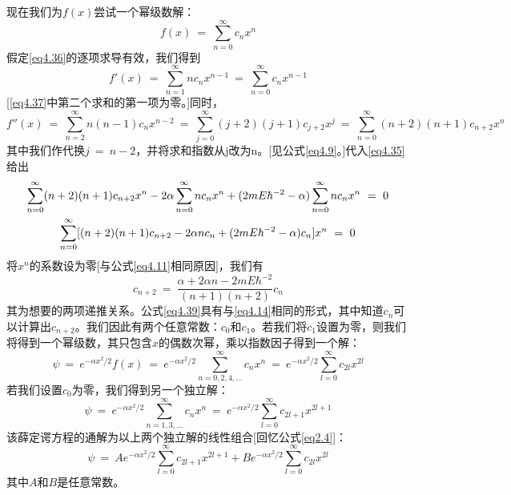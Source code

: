 \documentclass[12pt,a4paper,openany]{ctexbook}
\begin{document}
\begin{flushleft}
现在我们为$f(x)$尝试一个幂级数解：
\begin{equation}
    f(x)\ =\ \sum_{n=0}^\infty c_nx^n \label{eq4.36}
\end{equation}
假定\eqref{eq4.36}的逐项求导有效，我们得到
\begin{equation}
    f'(x)\ =\ \sum_{n=1}^\infty nc_nx^{n-1}\ =\ \sum_{n=0}^\infty c_nx^{n-1} \label{eq4.37}
\end{equation}
[\eqref{eq4.37}中第二个求和的第一项为零。]同时，
\begin{equation*}
    f''(x)\ =\ \sum_{n=2}^\infty n(n-1)c_nx^{n-2}\ =\ \sum_{j=0}^\infty (j+2)(j+1)c_{j+2}x^j\ =\ \sum_{n=0}^\infty (n+2)(n+1)c_{n+2}x^n
\end{equation*}
其中我们作代换$j\ =\ n-2$，并将求和指数从j改为n。[见公式\eqref{eq4.9}。]代入\eqref{eq4.35}给出
\begin{gather}
    \sum_{n=0}^\infty (n+2)(n+1)c_{n+2}x^n-2\alpha\sum_{n=0}^\infty nc_nx^n+(2mE\hbar^{-2}-\alpha)\sum_{n=0}^\infty nc_nx^n\ =\ 0 \notag \\
    \sum_{n=0}^\infty [(n+2)(n+1)c_{n+2}-2\alpha nc_n+(2mE\hbar^{-2}-\alpha)c_n]x^n\ =\ 0 \label{eq4.38}
\end{gather}
将$x^n$的系数设为零[与公式\eqref{eq4.11}相同原因]，我们有
\begin{equation}
    c_{n+2}\ =\ \frac{\alpha+2\alpha n-2mE\hbar^{-2}}{(n+1)(n+2)}c_n \label{eq4.39}
\end{equation}
其为想要的两项递推关系。公式\eqref{eq4.39}具有与\eqref{eq4.14}相同的形式，其中知道$c_n$可以计算出$c_{n+2}$。我们因此有两个任意常数：$c_0$和$c_1$。若我们将$c_1$设置为零，则我们将得到一个幂级数，其只包含$x$的偶数次幂，乘以指数因子得到一个解：
\begin{equation}
    \psi\ =\ e^{-\alpha x^2/2}f(x)\ =\ e^{-\alpha x^2/2}\sum_{n=0,2,4,\dots}^\infty c_nx^n\ =\ e^{-\alpha x^2/2}\sum_{l=0}^\infty c_{2l}x^{2l} \label{eq4.40}
\end{equation}
若我们设置$c_0$为零，我们得到另一个独立解：
\begin{equation}
    \psi\ =\ e^{-\alpha x^2/2}\sum_{n=1,3,\dots}^\infty c_nx^n\ =\ e^{-\alpha x^2/2}\sum_{l=0}^\infty c_{2l+1}x^{2l+1} \label{eq4.41}
\end{equation}
该薛定谔方程的通解为以上两个独立解的线性组合[回忆公式\eqref{eq2.4}]：
\begin{equation}
    \psi\ =\ Ae^{-\alpha x^2/2}\sum_{l=0}^\infty c_{2l+1}x^{2l+1}+Be^{-\alpha x^2/2}\sum_{l=0}^\infty c_{2l}x^{2l} \label{eq4.42}
\end{equation}
其中$A$和$B$是任意常数。


\end{flushleft}
\end{document}
